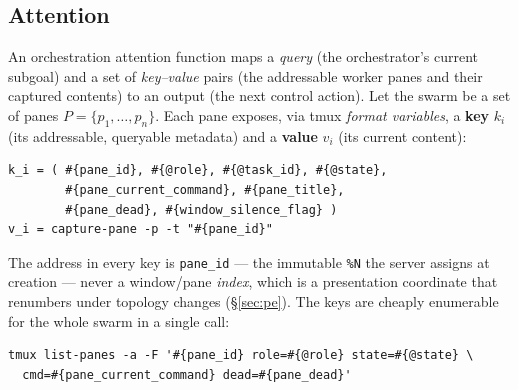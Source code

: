 \documentclass[10pt]{article}
\newcommand{\code}[1]{\texttt{\small #1}}
\begin{document}
\subsection{Attention}

An orchestration attention function maps a \emph{query} (the orchestrator's current
subgoal) and a set of \emph{key--value} pairs (the addressable worker panes and their
captured contents) to an output (the next control action). Let the swarm be a set of
panes $P = \{p_1,\dots,p_n\}$. Each pane exposes, via tmux \emph{format variables}, a
\textbf{key} $k_i$ (its addressable, queryable metadata) and a \textbf{value} $v_i$
(its current content):

\begin{lstlisting}
k_i = ( #{pane_id}, #{@role}, #{@task_id}, #{@state},
        #{pane_current_command}, #{pane_title},
        #{pane_dead}, #{window_silence_flag} )
v_i = capture-pane -p -t "#{pane_id}"
\end{lstlisting}

The address in every key is \code{pane\_id} --- the immutable \code{\%N} the server
assigns at creation --- never a window/pane \emph{index}, which is a presentation
coordinate that renumbers under topology changes (\S\ref{sec:pe}). The keys are
cheaply enumerable for the whole swarm in a single call:

\begin{lstlisting}
tmux list-panes -a -F '#{pane_id} role=#{@role} state=#{@state} \
  cmd=#{pane_current_command} dead=#{pane_dead}'
\end{lstlisting}
\end{document}
